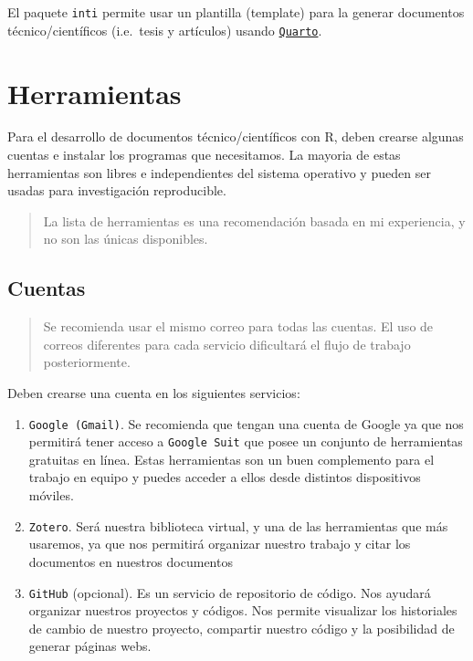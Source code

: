     
    
El paquete \texttt{inti} permite usar un plantilla (template) para la generar documentos técnico/científicos (i.e.~tesis y artículos) usando \href{https://quarto.org/}{\texttt{Quarto}}.

\section{Herramientas}\label{herramientas}

Para el desarrollo de documentos técnico/científicos con R, deben crearse algunas cuentas e instalar los programas que necesitamos. La mayoria de estas herramientas son libres e independientes del sistema operativo y pueden ser usadas para investigación reproducible.

\begin{quote}
La lista de herramientas es una recomendación basada en mi experiencia, y no son las únicas disponibles.
\end{quote}

\subsection{Cuentas}\label{cuentas}

\begin{quote}
Se recomienda usar el mismo correo para todas las cuentas. El uso de correos diferentes para cada servicio dificultará el flujo de trabajo posteriormente.
\end{quote}

Deben crearse una cuenta en los siguientes servicios:

\begin{enumerate}
\def\labelenumi{\arabic{enumi}.}
\item
  \texttt{Google\ (Gmail)}. Se recomienda que tengan una cuenta de Google ya que nos permitirá tener acceso a \texttt{Google\ Suit} que posee un conjunto de herramientas gratuitas en línea. Estas herramientas son un buen complemento para el trabajo en equipo y puedes acceder a ellos desde distintos dispositivos móviles.
\item
  \texttt{Zotero}. Será nuestra biblioteca virtual, y una de las herramientas que más usaremos, ya que nos permitirá organizar nuestro trabajo y citar los documentos en nuestros documentos
\item
  \texttt{GitHub} (opcional). Es un servicio de repositorio de código. Nos ayudará organizar nuestros proyectos y códigos. Nos permite visualizar los historiales de cambio de nuestro proyecto, compartir nuestro código y la posibilidad de generar páginas webs.
\end{enumerate}


